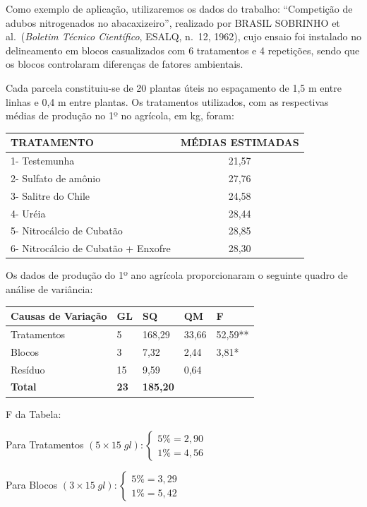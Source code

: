 \documentclass[
]{book}
\begin{document}
Como exemplo de aplicação, utilizaremos os dados do trabalho: ``Competição de adubos nitrogenados no abacaxizeiro'', realizado por BRASIL SOBRINHO et al.~(\emph{Boletim Técnico Científico}, ESALQ, n.~12, 1962), cujo ensaio foi instalado no delineamento em blocos casualizados com 6 tratamentos e 4 repetições, sendo que os blocos controlaram diferenças de fatores ambientais.

Cada parcela constituiu-se de 20 plantas úteis no espaçamento de 1,5 m entre linhas e 0,4 m entre plantas. Os tratamentos utilizados, com as respectivas médias de produção no 1º no agrícola, em kg, foram:

\begin{longtable}[]{@{}lc@{}}
\toprule
TRATAMENTO & MÉDIAS ESTIMADAS\tabularnewline
\midrule
\endhead
1- Testemunha & 21,57\tabularnewline
2- Sulfato de amônio & 27,76\tabularnewline
3- Salitre do Chile & 24,58\tabularnewline
4- Uréia & 28,44\tabularnewline
5- Nitrocálcio de Cubatão & 28,85\tabularnewline
6- Nitrocálcio de Cubatão + Enxofre & 28,30\tabularnewline
\bottomrule
\end{longtable}

Os dados de produção do 1º ano agrícola proporcionaram o seguinte quadro de análise de variância:

\begin{table}[H]
\centering
\begin{tabular}{l|l|l|l|l}
\hline
Causas de Variação & GL & SQ & QM & F\\
\hline
Tratamentos & 5 & 168,29 & 33,66 & 52,59**\\
\hline
Blocos & 3 & 7,32 & 2,44 & 3,81*\\
\hline
Resíduo & 15 & 9,59 & 0,64 & \\
\hline
\textbf{Total} & \textbf{23} & \textbf{185,20} & \textbf{} & \textbf{}\\
\hline
\end{tabular}
\end{table}

F da Tabela:

Para Tratamentos \((5 \times 15\; gl): \begin{cases} 5\%=2,90 \\ 1\% = 4,56\end{cases}\)

Para Blocos \((3 \times 15\; gl): \begin{cases} 5\%=3,29 \\ 1\% = 5,42\end{cases}\)
\end{document}
